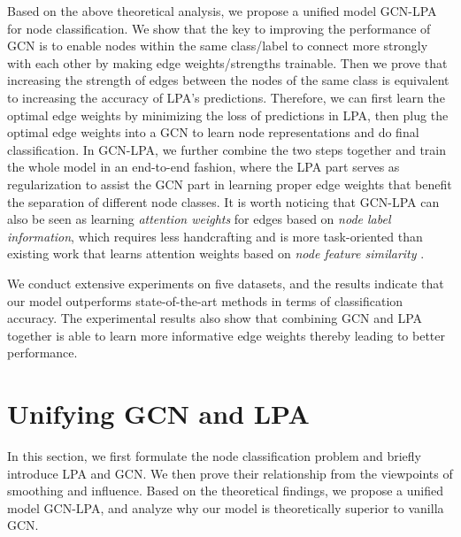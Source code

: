 \documentclass{article}
\begin{document}
	Based on the above theoretical analysis, we propose a unified model GCN-LPA for node classification.
	We show that the key to improving the performance of GCN is to enable nodes within the same class/label to connect more strongly with each other by making edge weights/strengths trainable.
	Then we prove that increasing the strength of edges between the nodes of the same class is equivalent to increasing the accuracy of LPA's predictions.
	Therefore, we can first learn the optimal edge weights by minimizing the loss of predictions in LPA, then plug the optimal edge weights into a GCN to learn node representations and do final classification.
	In GCN-LPA, we further combine the two steps together and train the whole model in an end-to-end fashion, where the LPA part serves as regularization to assist the GCN part in learning proper edge weights that benefit the separation of different node classes.
	It is worth noticing that GCN-LPA can also be seen as learning \textit{attention weights} for edges based on \textit{node label information}, which requires less handcrafting and is more task-oriented than existing work that learns attention weights based on \textit{node feature similarity} \citep{velivckovic2018graph,thekumparampil2018attention,zhang2018gaan,liu2019geniepath}.
	
	We conduct extensive experiments on five datasets, and the results indicate that our model outperforms state-of-the-art methods in terms of classification accuracy.
	The experimental results also show that combining GCN and LPA together is able to learn more informative edge weights thereby leading to better performance.
	
	
	
\section{Unifying GCN and LPA}
    In this section, we first formulate the node classification problem and briefly introduce LPA and GCN.
    We then prove their relationship from the viewpoints of smoothing and influence.
    Based on the theoretical findings, we propose a unified model GCN-LPA, and analyze why our model is theoretically superior to vanilla GCN.
    
\end{document}
